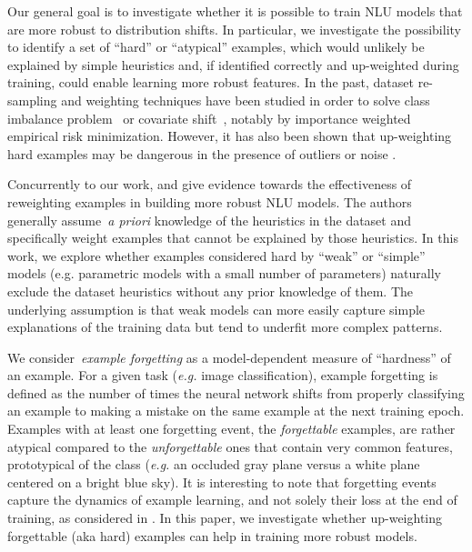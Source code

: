 Our general goal is to investigate whether it is possible to train NLU models that are more robust to distribution shifts. In particular, we investigate the possibility to identify a set of ``hard'' or ``atypical'' examples, which would unlikely be explained by simple heuristics and, if identified correctly and up-weighted during training, could enable learning more robust features. In the past, dataset re-sampling and weighting techniques have been studied in order to solve class imbalance problem~\cite{chawla2002smote} or covariate shift~\cite{sugiyama2007covariate}, notably by importance weighted empirical risk minimization. However, it has also been shown that up-weighting hard examples may be dangerous in the presence of outliers or noise \cite{chapelle2007training,Kumar10,toneva2018empirical}.

Concurrently to our work,  and  give evidence towards the effectiveness of reweighting examples in building more robust NLU models. The authors generally assume~\emph{a priori} knowledge of the heuristics in the dataset and specifically weight examples that cannot be explained by those heuristics. In this work, we explore whether examples considered hard by ``weak'' or ``simple'' models (e.g. parametric models with a small number of parameters) naturally exclude the dataset heuristics without any prior knowledge of them. The underlying assumption is that weak models can more easily capture simple explanations of the training data but tend to underfit more complex patterns.

We consider~\emph{example forgetting} \cite{toneva2018empirical} as a model-dependent measure of ``hardness'' of an example. For a given task (\textit{e.g.} image classification), example forgetting is defined as the number of times the neural network shifts from properly classifying an example to making a mistake on the same example at the next training epoch. Examples with at least one forgetting event, the \emph{forgettable} examples, are rather atypical compared to the \emph{unforgettable} ones that contain very common features, prototypical of the class (\textit{e.g.} an occluded gray plane versus a white plane centered on a bright blue sky). It is interesting to note that forgetting events capture the dynamics of example learning, and not solely their loss at the end of training, as considered in . In this paper, we investigate whether up-weighting forgettable (aka hard) examples can help in training more robust models.  

